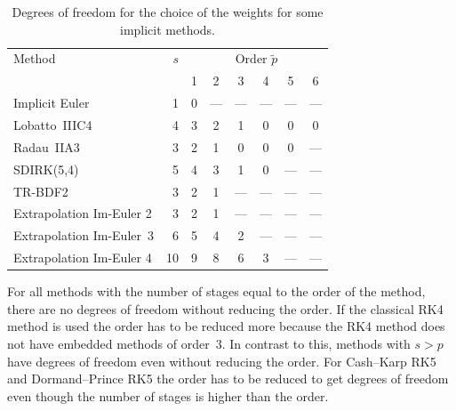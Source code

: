 \documentclass[a4paper]{article}
\numberwithin{equation}{section}
\theoremstyle{plain}
\theoremstyle{definition}
\numberwithin{theorem}{section}
\newcommand{\1}{\mathbbm{1}}
\begin{document}
\begin{table}[h!]
\centering   %
   \begin{tabular*}{\linewidth}{@{\extracolsep{\fill}}lr*6c@{}}
    \toprule
    Method & $s$ & \multicolumn{6}{c}{Order $\tilde p$} \\
    & & 1 & 2 & 3 & 4 & 5 & 6 \\
    \midrule
    Implicit Euler& 1&0& --- & --- & --- & --- & ---  \\
    Lobatto~IIIC4 \cite{chipman1971stable} & 4&3&2&1&0&0&0 \\
    Radau~IIA3 \cite{ehle1969pade} & 3&2&1&0&0&0& ---  \\
    SDIRK(5,4) \cite[eq. (6.18)]{hairer_solving_1996}& 5&4&3&1&0& --- & ---  \\
    TR-BDF2 \cite{bank1985transient} & 3&2&1& --- & --- & --- & ---  \\
    Extrapolation Im-Euler 2& 3&2&1& --- & --- & --- & ---  \\
    Extrapolation Im-Euler~3& 6&5&4&2& --- & --- & ---  \\
    Extrapolation Im-Euler 4& 10&9&8&6&3& --- & ---  \\
    \bottomrule
  \end{tabular*}
  \caption{Degrees of freedom for the choice of the weights for some implicit methods.} %
  \label{table:DOF_imp}
\end{table}


For all methods with the number of stages equal to the order of the method, there are no degrees of freedom without reducing the order.  
If the classical RK4 method is used the order has to be reduced more because the RK4 method does not have embedded methods of order~3.
In contrast to this, methods with $s > p$ have degrees of freedom even without reducing the order.
For Cash--Karp RK5 and Dormand--Prince RK5 the order has to be reduced to get degrees of freedom even though the number of stages is higher than the order.
\end{document}
